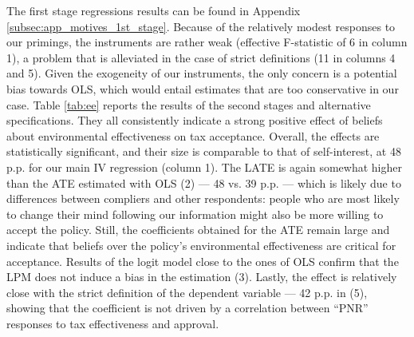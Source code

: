 \documentclass[12pt]{article} %
\begin{document}

The first stage regressions results can be found in Appendix \ref{subsec:app_motives_1st_stage}. Because of the relatively modest responses to our primings, the instruments are rather weak (effective F-statistic of 6 in column 1), a problem that is alleviated in the case of strict definitions (11 in columns 4 and 5). Given the exogeneity of our instruments, the only concern is a potential bias towards OLS, which would entail estimates that are too conservative in our case. Table \ref{tab:ee} reports the results of the second stages and alternative specifications. They all consistently indicate a strong positive effect of beliefs about environmental effectiveness on tax acceptance. Overall, the effects are statistically significant, and their size is comparable to that of self-interest, at 48 p.p. for our main IV regression (column 1). The LATE is again somewhat higher than the ATE estimated with OLS (2) --- 48 vs. 39 p.p. --- which is likely due to differences between compliers and other respondents: people who are most likely to change their mind following our information might also be more willing to accept the policy. Still, the coefficients obtained for the ATE remain large and indicate that beliefs over the policy's environmental effectiveness are critical for acceptance. Results of the logit model close to the ones of OLS confirm that the LPM does not induce a bias in the estimation (3). Lastly, the effect is relatively close with the strict definition of the dependent variable --- 42 p.p. in (5), showing that the coefficient is not driven by a correlation between ``PNR'' responses to tax effectiveness and approval.

\end{document}
